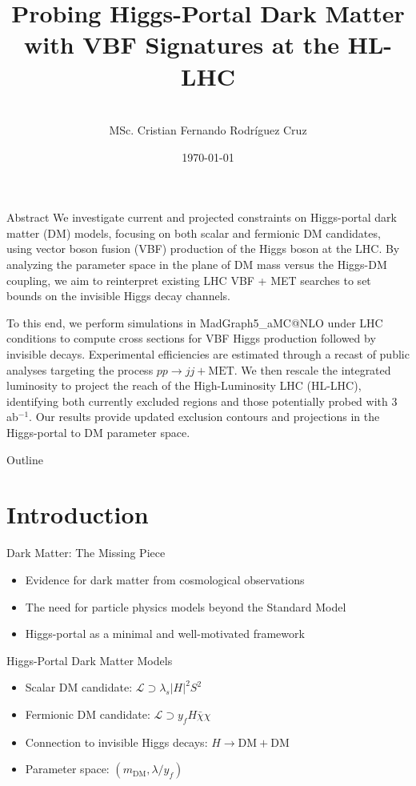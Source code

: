\documentclass{../../bredelebeamer}
\title[Higgs-Portal DM with VBF at HL-LHC]{Probing Higgs-Portal Dark Matter with VBF Signatures at the HL-LHC}
\subtitle{}
\author[C. Rodríguez]{
	\vspace{2em}\\
	MSc. Cristian Fernando Rodríguez Cruz\inst{1}\\
	\vspace{1em}
}
\institute[Uniandes]{\inst{1} Universidad de los Andes\and
}
\date{\today}
\begin{document}
\begin{frame}
    \titlepage
\end{frame}
\begin{frame}{Abstract}
    \justifying
    We investigate current and projected constraints on Higgs-portal dark matter (DM) models, focusing on both scalar and fermionic DM candidates, using vector boson fusion (VBF) production of the Higgs boson at the LHC. By analyzing the parameter space in the plane of DM mass versus the Higgs-DM coupling, we aim to reinterpret existing LHC VBF + MET searches to set bounds on the invisible Higgs decay channels.

    \vfill

    To this end, we perform simulations in MadGraph5\_aMC@NLO under LHC conditions to compute cross sections for VBF Higgs production followed by invisible decays. Experimental efficiencies are estimated through a recast of public analyses targeting the process $pp \to jj + \text{MET}$. We then rescale the integrated luminosity to project the reach of the High-Luminosity LHC (HL-LHC), identifying both currently excluded regions and those potentially probed with 3 ab$^{-1}$. Our results provide updated exclusion contours and projections in the Higgs-portal to DM parameter space.
\end{frame}

\begin{frame}{Outline}
    \tableofcontents
\end{frame}

\section{Introduction}
\begin{frame}{Dark Matter: The Missing Piece}
    \begin{itemize}
        \item Evidence for dark matter from cosmological observations
        \item The need for particle physics models beyond the Standard Model
        \item Higgs-portal as a minimal and well-motivated framework
    \end{itemize}
\end{frame}

\begin{frame}{Higgs-Portal Dark Matter Models}
    \begin{itemize}
        \item Scalar DM candidate: $\mathcal{L} \supset \lambda_s |H|^2 S^2$
        \item Fermionic DM candidate: $\mathcal{L} \supset y_f H \bar{\chi} \chi$
        \item Connection to invisible Higgs decays: $H \to \text{DM} + \text{DM}$
        \item Parameter space: $(m_{\text{DM}}, \lambda/y_f)$
    \end{itemize}
\end{frame}
\end{document}
